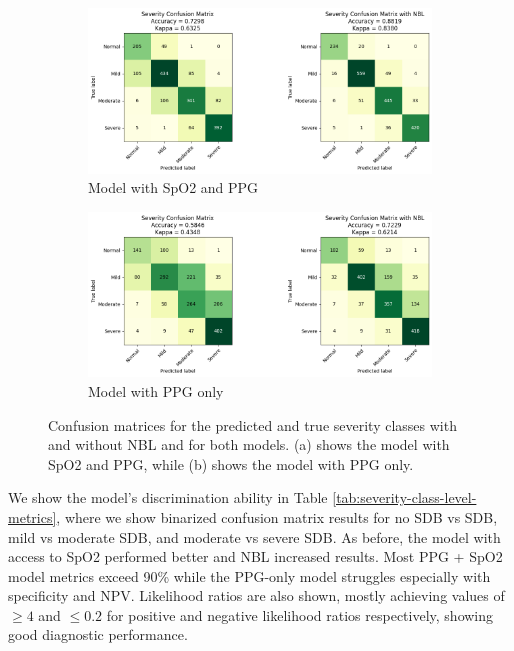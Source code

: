 \begin{figure}
      \begin{subfigure}{\textwidth}
          \includegraphics[width=\textwidth]{images/SevClassConfMatrix}
          \caption{Model with SpO2 and PPG}
      \end{subfigure}
      \begin{subfigure}{\textwidth}
          \includegraphics[width=\textwidth]{images/SevClassConfMatrixNoSpO2}
          \caption{Model with PPG only}
      \end{subfigure}
    \caption{Confusion matrices for the predicted and true severity classes with and without NBL and for both models. (a) shows the model with SpO2 and PPG, while (b) shows the model with PPG only.}
    \label{fig:severity-class-level-confusion-matrices}
\end{figure}

We show the model's discrimination ability in Table \ref{tab:severity-class-level-metrics}, where we show binarized confusion matrix results for no SDB vs SDB, mild vs moderate SDB, and moderate vs severe SDB. As before, the model with access to SpO2 performed better and NBL increased results. Most PPG + SpO2 model metrics exceed 90\% while the PPG-only model struggles especially with specificity and NPV. Likelihood ratios are also shown, mostly achieving values of $\geq 4$ and $\leq 0.2$ for positive and negative likelihood ratios respectively, showing good diagnostic performance.

